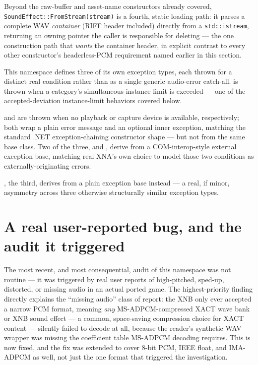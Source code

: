 Beyond the raw-buffer and asset-name constructors already covered,
\texttt{SoundEffect::FromStream(stream)} is a fourth, static loading path: it parses a
complete WAV \emph{container} (RIFF header included) directly from a
\texttt{std::istream}, returning an owning pointer the caller is responsible for deleting ---
the one  construction path that \emph{wants} the container header,
in explicit contrast to every other constructor's headerless-PCM requirement named earlier in
this section.

This namespace defines three of its own exception types, each thrown for a distinct real
condition rather than as a single generic audio-error catch-all.
 is thrown when a category's simultaneous-instance limit
is exceeded --- one of the accepted-deviation instance-limit behaviors covered below.

 and  are thrown
when no playback or capture device is available, respectively; both wrap a plain error message
and an optional inner exception, matching the standard .NET exception-chaining constructor
shape --- but not from the same base class. Two of the three,
 and , derive from a
COM-interop-style external exception base, matching real XNA's own choice to model those two
conditions as externally-originating errors.

, the third, derives from a plain exception base
instead --- a real, if minor, asymmetry across three otherwise structurally similar
exception types.

\section{A real user-reported bug, and the audit it triggered}

The most recent, and most consequential, audit of this namespace was not routine --- it was
triggered by real user reports of high-pitched, sped-up, distorted, or missing audio in an
actual ported game. The highest-priority finding directly explains the ``missing audio''
class of report: the XNB  only ever accepted a narrow PCM format,
meaning \emph{any} MS-ADPCM-compressed XACT wave bank or XNB sound effect --- a common,
space-saving compression choice for XACT content --- silently failed to decode at all,
because the reader's synthetic WAV wrapper was missing the coefficient table MS-ADPCM
decoding requires. This is now fixed, and the fix was extended to cover 8-bit PCM, IEEE
float, and IMA-ADPCM as well, not just the one format that triggered the investigation.

